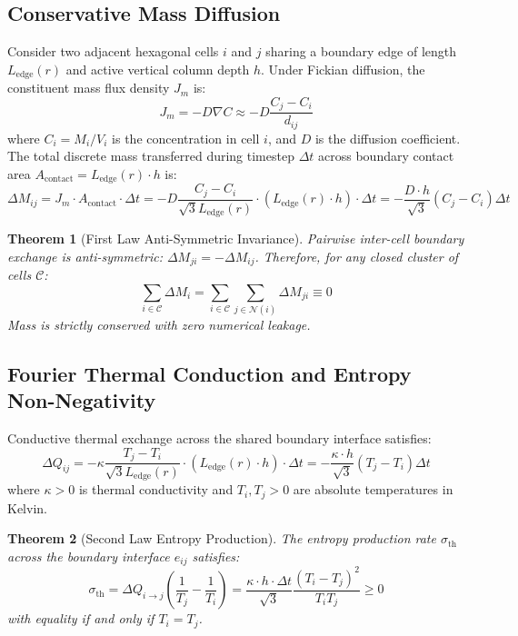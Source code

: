 \documentclass[11pt,a4paper]{article}
\newtheorem{theorem}{Theorem}
\begin{document}
\subsection{Conservative Mass Diffusion}
Consider two adjacent hexagonal cells $i$ and $j$ sharing a boundary edge of length $L_{\text{edge}}(r)$ and active vertical column depth $h$. Under Fickian diffusion, the constituent mass flux density $J_{m}$ is:
\begin{equation}
J_{m} = -D \nabla C \approx -D \frac{C_j - C_i}{d_{ij}}
\end{equation}
where $C_i = M_i / V_i$ is the concentration in cell $i$, and $D$ is the diffusion coefficient. The total discrete mass transferred during timestep $\Delta t$ across boundary contact area $A_{\text{contact}} = L_{\text{edge}}(r) \cdot h$ is:
\begin{equation}
\Delta M_{ij} = J_m \cdot A_{\text{contact}} \cdot \Delta t = -D \frac{C_j - C_i}{\sqrt{3} L_{\text{edge}}(r)} \cdot (L_{\text{edge}}(r) \cdot h) \cdot \Delta t = -\frac{D \cdot h}{\sqrt{3}} (C_j - C_i) \Delta t
\end{equation}

\begin{theorem}[First Law Anti-Symmetric Invariance]
Pairwise inter-cell boundary exchange is anti-symmetric: $\Delta M_{ji} = -\Delta M_{ij}$. Therefore, for any closed cluster of cells $\mathcal{C}$:
\begin{equation}
\sum_{i \in \mathcal{C}} \Delta M_i = \sum_{i \in \mathcal{C}} \sum_{j \in \mathcal{N}(i)} \Delta M_{ji} \equiv 0
\end{equation}
Mass is strictly conserved with zero numerical leakage.
\end{theorem}

\subsection{Fourier Thermal Conduction and Entropy Non-Negativity}
Conductive thermal exchange across the shared boundary interface satisfies:
\begin{equation}
\Delta Q_{ij} = -\kappa \frac{T_j - T_i}{\sqrt{3} L_{\text{edge}}(r)} \cdot (L_{\text{edge}}(r) \cdot h) \cdot \Delta t = -\frac{\kappa \cdot h}{\sqrt{3}} (T_j - T_i) \Delta t
\end{equation}
where $\kappa > 0$ is thermal conductivity and $T_i, T_j > 0$ are absolute temperatures in Kelvin.

\begin{theorem}[Second Law Entropy Production]
The entropy production rate $\sigma_{\text{th}}$ across the boundary interface $e_{ij}$ satisfies:
\begin{equation}
\sigma_{\text{th}} = \Delta Q_{i \to j} \left( \frac{1}{T_j} - \frac{1}{T_i} \right) = \frac{\kappa \cdot h \cdot \Delta t}{\sqrt{3}} \frac{(T_i - T_j)^2}{T_i T_j} \ge 0
\end{equation}
with equality if and only if $T_i = T_j$.
\end{theorem}
\end{document}
